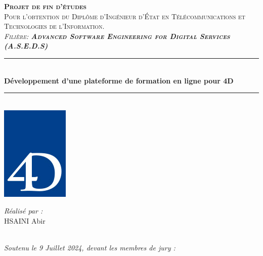 \vspace{0.5cm}
\begin{center}
{\large \textsc{\textbf{Projet de fin d’études}}}\\[0.1cm]
{\large \textsc{Pour l’obtention du Diplôme d’Ingénieur d’État en Télécommunications et Technologies de l’Information.}}\\[0.1cm]
{\large \textsc{\textit{Filière:\textbf{ Advanced Software Engineering for Digital Services (A.S.E.D.S)}}}} \\[0.05cm] 
\vspace{-0.04cm}
\rule{\linewidth}{0.3mm} \\[0.4cm]   %
 { \huge \textbf{ Développement d’une plateforme de formation en ligne pour 4D }} \\[0.15cm] 
\rule{\linewidth}{0.3mm} \\[0.4cm]


\includegraphics[scale=0.400]{Logos/Logo-4D.jpg}  %

\vspace{1cm}

\noindent
\begin{minipage}{0.9\textwidth}
    \vspace{-7mm}
  \begin{flushleft} \large
    \emph{Réalisé par :}\\
    \textsc{HSAINI} Abir %
  \end{flushleft}
\end{minipage}
\begin{minipage}{0.4\textwidth}

\end{minipage}\\[0.4cm]

{\large \textit{Soutenu le 9 Juillet 2024, devant les membres de jury : }}\\[0.3cm]



\end{center}
